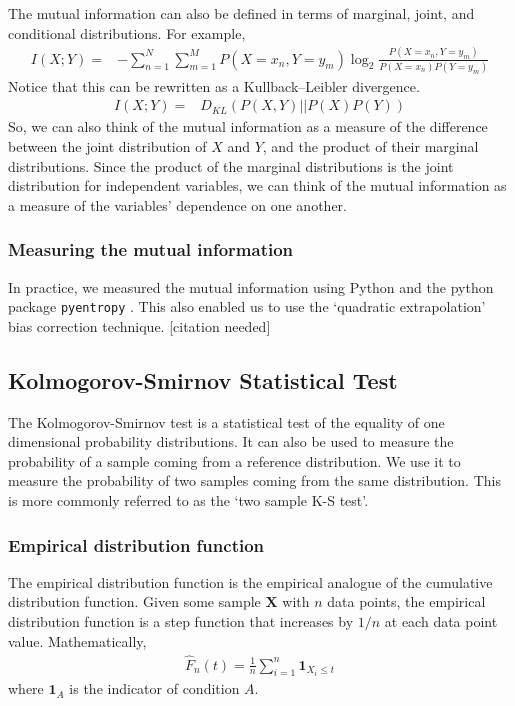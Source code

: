 \documentclass[a4paper,12pt]{article}
\theoremstyle{definition}
\begin{document}
The mutual information can also be defined in terms of marginal, joint, and conditional distributions. For example,
\begin{align}
I(X;Y)  =& -\sum_{n=1}^N \sum_{m=1}^M P(X=x_n, Y=y_m) \log _2 \frac{P(X=x_n, Y=y_m)}{P(X=x_n) P(Y=y_m)}
\end{align}
Notice that this can be rewritten as a Kullback–Leibler divergence.
\begin{align}
I(X;Y)  =& D_{KL}(P(X,Y)|| P(X)P(Y))
\end{align}
So, we can also think of the mutual information as a measure of the difference between the joint distribution of $X$ and $Y$, and the product of their marginal distributions. Since the product of the marginal distributions is the joint distribution for independent variables, we can think of the mutual information as a measure of the variables' dependence on one another.

\subsubsection{Measuring the mutual information}
In practice, we measured the mutual information using Python and the python package \texttt{pyentropy} \cite{ince}. This also enabled us to use the `quadratic extrapolation' bias correction technique. [citation needed]

\subsection{Kolmogorov-Smirnov Statistical Test}\label{sec:ks_test}
The Kolmogorov-Smirnov test is a statistical test of the equality of one dimensional probability distributions. It can also be used to measure the probability of a sample coming from a reference distribution. We use it to measure the probability of two samples coming from the same distribution. This is more commonly referred to as the `two sample K-S test'.

\subsubsection{Empirical distribution function}
The empirical distribution function is the empirical analogue of the cumulative distribution function. Given some sample $\mathbf{X}$ with $n$ data points, the empirical distribution function is a step function that increases by $1/n$ at each data point value. Mathematically,
\begin{align}
  \hat{F}_{n}(t) = \frac{1}{n} \sum_{i=1}^n \mathbf{1}_{X_i \leq t}
\end{align}
where $\mathbf{1}_{A}$ is the indicator of condition $A$.
\end{document}
